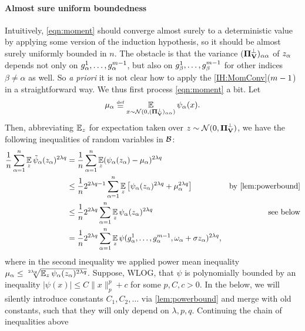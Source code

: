 \documentclass[main.tex]{subfiles}
\begin{document}
\paragraph{Almost sure uniform boundedness}
Intuitively, \cref{eqn:moment} should converge almost surely to a deterministic value by applying some version of the induction hypothesis, so it should be almost surely uniformly bounded in $n$.
The obstacle is that the variance $(\boldsymbol{\Pi}_{\mathbf{V}}^\perp)_{\alpha\alpha}$ of $z_\alpha$ depends not only on $g^1_\alpha, \ldots, g^{m-1}_\alpha$, but also on $g^1_\beta, \ldots, g^{m-1}_\beta$ for other indices $\beta \not= \alpha$ as well.
So \textit{a priori} it is not clear how to apply the \ref{IH:MomConv}($m-1$) in a straightforward way.
We thus first process \cref{eqn:moment} a bit.
Let
\[\mu_\alpha \defeq \EV_{x \sim \Gaus(0, (\PP^\perp_{\Vme})_{\alpha\alpha})} \psi_\alpha(x).\]
Then, abbreviating $\operatorname*{\mathbb{E}}_z$ for expectation taken over $z \sim \mathcal{N}(0, \boldsymbol{\Pi}^\perp_{\mathbf{V}})$, we have the following inequalities of random variables in $\mathcal{B}$:
\begin{align*}
  \f 1 n \sum_{\alpha=1}^n \EV_z \tilde \psi_\alpha(\rvec_\alpha)^{2\lambda q}
  &=
      \f 1 n \sum_{\alpha=1}^n \EV_z (\psi_\alpha(\rvec_\alpha) - \mu_\alpha)^{2\lambda q}
      \\
  &\le
      \f 1 n 2^{2\lambda q - 1}
          \sum_{\alpha=1}^n
              \EV_z 
                  \left[
                      \psi_\alpha(\rvec_\alpha)^{2\lambda q} + \mu_\alpha^{2\lambda q}
                  \right]
  &{\text{by \cref{lem:powerbound}}}
      \\
  &\le
      \f 1 n 2^{2\lambda q}
          \sum_{\alpha=1}^n
              \EV_z 
                  \psi_\alpha(\rvec_\alpha)^{2\lambda q}
  &\text{see below}
      \\
  &=
      \f 1 n 2^{2\lambda q}
      \sum_{\alpha=1}^n
          \EV_z 
              \psi(g^1_\alpha, \ldots, g^{\MM-1}_\alpha, \omega_\alpha + \sigma \rvec_\alpha )^{2\lambda q}
      ,
\end{align*}
where in the second inequality we applied power mean inequality $\mu_\alpha \le \sqrt[2\lambda q]{\operatorname*{\mathbb{E}}_z\psi_\alpha(z_\alpha)^{2\lambda q}}$.
Suppose, WLOG, that $\psi$ is polynomially bounded by an inequality $|\psi(x)| \le C \|x\|^p_p + c$ for some $p, C, c > 0$.
In the below, we will silently introduce constants $C_1, C_2, \ldots$ via \cref{lem:powerbound} and merge with old constants, such that they will only depend on $\lambda, p, q$.
Continuing the chain of inequalities above
\end{document}

